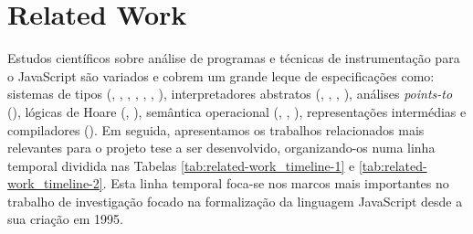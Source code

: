 \documentclass[runningheads]{llncs}
\begin{document}
\section{Related Work}
\label{sec:Related Work}



Estudos científicos sobre análise de programas e técnicas de instrumentação para o JavaScript são variados e cobrem um grande leque de especificações como: sistemas de tipos (\cite{Type_Analysis_for_JavaScript}, \cite{Towards_Type_Inference_for_JavaScript}, \cite{Understanding_TypeScript},  \cite{Fast_and_precise_hybrid_type_inference_for_JavaScript}, \cite{Depedent_Types_for_JavaScript}, \cite{Safe_&_Efficient_Gradual_Typing_for_TypeScript},  \cite{Type_Inference_for_Static_Compilation_of_JavaScript}), interpretadores abstratos (\cite{SAFE:Formal_Specification_and_Implementation_of_a_Scalable_Analysis_Framework_for_ECMAScript}, \cite{JSAI:a_static_analysis_platform_for_JavaScript}, \cite{Scalable_and_Precise_Static_Analysis_of_JavaScript_Applications_via_Loop-Sensitivity},  \cite{Combining_string_abstract_domains_for_JavaScript_analysis:an_evaluation)}), análises \emph{points-to} (\cite{Points-to_analysis_for_JavaScript}), lógicas de Hoare (\cite{Javert-2017}, \cite{Javert-2019}), semântica operacional (\cite{JSCert-2014}, \cite{KJS-2015}, \cite{JSExplain-2018}), representações intermédias e compiladores (\cite{Dynamic_property_caches:a_step_towards_faster_JavaScript_proxy_objects}). Em seguida, apresentamos os trabalhos relacionados mais relevantes para o projeto tese a ser desenvolvido, organizando-os numa linha temporal dividida nas Tabelas \ref{tab:related-work_timeline-1} e \ref{tab:related-work_timeline-2}. Esta linha temporal foca-se nos marcos mais importantes no trabalho de investigação focado na formalização da linguagem JavaScript desde a sua criação em 1995.
\end{document}

